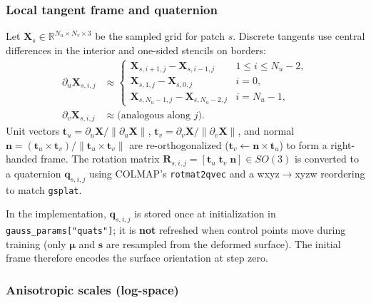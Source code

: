\documentclass{report}
\newcommand{\code}[1]{\nolinkurl{#1}}
\begin{document}
\subsubsection{Local tangent frame and quaternion}
\label{subsubsec:init_quat}

Let $\mathbf{X}_s\in\mathbb{R}^{N_u\times N_v\times 3}$ be the sampled grid for patch $s$. Discrete tangents use central differences in the interior and one-sided stencils on borders:
\begin{align}
\partial_u \mathbf{X}_{s,i,j} &\approx
\begin{cases}
\mathbf{X}_{s,i+1,j}-\mathbf{X}_{s,i-1,j} & 1\le i\le N_u-2,\\
\mathbf{X}_{s,1,j}-\mathbf{X}_{s,0,j} & i=0,\\
\mathbf{X}_{s,N_u-1,j}-\mathbf{X}_{s,N_u-2,j} & i=N_u-1,
\end{cases}
\label{eq:fd_u}\\
\partial_v \mathbf{X}_{s,i,j} &\approx
\text{(analogous along $j$)}.
\label{eq:fd_v}
\end{align}
Unit vectors $\mathbf{t}_u=\partial_u\mathbf{X}/\|\partial_u\mathbf{X}\|$, $\mathbf{t}_v=\partial_v\mathbf{X}/\|\partial_v\mathbf{X}\|$, and normal $\mathbf{n}=(\mathbf{t}_u\times\mathbf{t}_v)/\|\mathbf{t}_u\times\mathbf{t}_v\|$ are re-orthogonalized ($\mathbf{t}_v\leftarrow \mathbf{n}\times\mathbf{t}_u$) to form a right-handed frame. The rotation matrix $\mathbf{R}_{s,i,j}=[\mathbf{t}_u\;\mathbf{t}_v\;\mathbf{n}]\in SO(3)$ is converted to a quaternion $\mathbf{q}_{s,i,j}$ using COLMAP's \code{rotmat2qvec} and a wxyz$\rightarrow$xyzw reordering to match \code{gsplat}.

In the implementation, $\mathbf{q}_{s,i,j}$ is stored once at initialization in \code{gauss\_params["quats"]}; it is \textbf{not} refreshed when control points move during training (only $\boldsymbol{\mu}$ and $\mathbf{s}$ are resampled from the deformed surface). The initial frame therefore encodes the surface orientation at step zero.

\subsubsection{Anisotropic scales (log-space)}
\label{subsubsec:init_scales}
\end{document}
